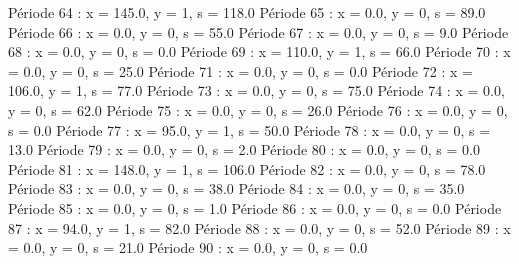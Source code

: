 Période 64 : x = 145.0, y = 1, s = 118.0
Période 65 : x = 0.0, y = 0, s = 89.0
Période 66 : x = 0.0, y = 0, s = 55.0
Période 67 : x = 0.0, y = 0, s = 9.0
Période 68 : x = 0.0, y = 0, s = 0.0
Période 69 : x = 110.0, y = 1, s = 66.0
Période 70 : x = 0.0, y = 0, s = 25.0
Période 71 : x = 0.0, y = 0, s = 0.0
Période 72 : x = 106.0, y = 1, s = 77.0
Période 73 : x = 0.0, y = 0, s = 75.0
Période 74 : x = 0.0, y = 0, s = 62.0
Période 75 : x = 0.0, y = 0, s = 26.0
Période 76 : x = 0.0, y = 0, s = 0.0
Période 77 : x = 95.0, y = 1, s = 50.0
Période 78 : x = 0.0, y = 0, s = 13.0
Période 79 : x = 0.0, y = 0, s = 2.0
Période 80 : x = 0.0, y = 0, s = 0.0
Période 81 : x = 148.0, y = 1, s = 106.0
Période 82 : x = 0.0, y = 0, s = 78.0
Période 83 : x = 0.0, y = 0, s = 38.0
Période 84 : x = 0.0, y = 0, s = 35.0
Période 85 : x = 0.0, y = 0, s = 1.0
Période 86 : x = 0.0, y = 0, s = 0.0
Période 87 : x = 94.0, y = 1, s = 82.0
Période 88 : x = 0.0, y = 0, s = 52.0
Période 89 : x = 0.0, y = 0, s = 21.0
Période 90 : x = 0.0, y = 0, s = 0.0



